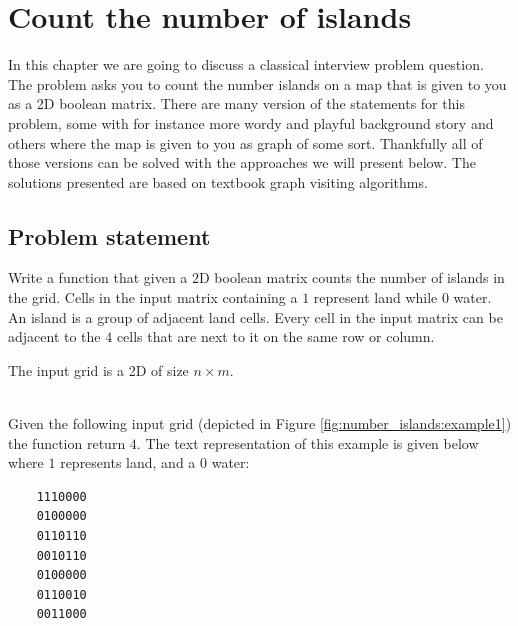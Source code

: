 %

\chapter{Count the number of islands}
\label{ch:number_islands}
In this chapter we are going to discuss a classical interview problem question. The problem asks you
to count the number islands on a map that is given to you as a 2D boolean matrix. There are many
version of the statements for this problem, some with for instance more wordy and playful background
story and others where the map is given to you as graph of some sort. Thankfully all of those
versions can be solved with the approaches we will present below. The solutions presented are based
on textbook graph visiting algorithms.

\section{Problem statement}
\begin{exercise}
Write a function that given a $2$D boolean matrix counts the number of islands in the grid. Cells in
the input matrix containing a $1$ represent land while $0$  water. An island is a group of adjacent
land cells. Every cell in the input matrix can be adjacent to the $4$ cells that are next to it on
the same row or column.

The input grid is a 2D  of size $n\times m$. 
	\begin{example}
		\hfill \\
		Given the following input grid (depicted in Figure \ref{fig:number_islands:example1}) the
		function return $4$. The text representation of this example is given below where $1$
		represents land, and a $0$ water:	
	\begin{verbatim}
	1110000
	0100000
	0110110
	0010110
	0100000
	0110010
	0011000
	\end{verbatim}
	\end{example}

\end{exercise}

